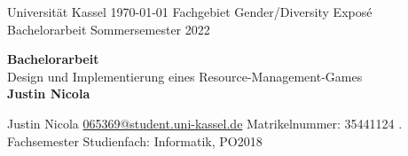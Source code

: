 \thispagestyle{empty}

\begin{flushleft}
	Universität Kassel \hfill \today \linebreak
	Fachgebiet Gender/Diversity \linebreak
	Exposé Bachelorarbeit \linebreak
	Sommersemester 2022 \linebreak
\end{flushleft}

\vfill

\begin{center}
	{\Huge \bfseries Bachelorarbeit} \\[12pt]
	{\huge Design und Implementierung eines Resource-Management-Games} \\[24pt]
	{\Large \bfseries Justin Nicola}
\end{center}

\vfill
\vfill

\begin{flushleft}
	Justin Nicola \linebreak
	\href{mailto:065369@student.uni-kassel.de}{065369@student.uni-kassel.de} \linebreak
	Matrikelnummer: 35441124 . Fachsemester \linebreak
	Studienfach: Informatik, PO2018
\end{flushleft}

